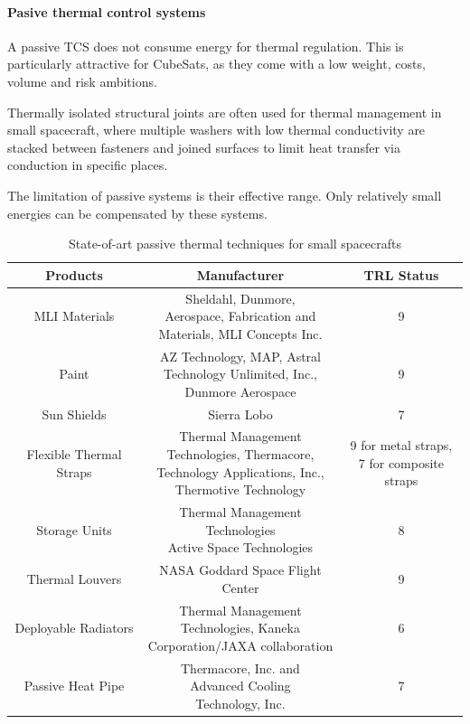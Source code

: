 \paragraph{Pasive thermal control systems}

A passive TCS does not consume energy for thermal regulation. This is particularly
attractive for CubeSats, as they come with a low weight, costs, volume and risk ambitions.

Thermally isolated structural joints are often used for thermal management in small
spacecraft, where multiple washers with low thermal conductivity are stacked
between fasteners and joined surfaces to limit heat transfer via conduction in
specific places.

The limitation of passive systems is their effective range. Only relatively small
energies can be compensated by these systems.

\begin{table}[h!]
	\centering
	\begin{tabular}{c c c}
		\hline
		\textbf{Products} & \textbf{Manufacturer} & \textbf{TRL Status} \\
		\hline
		MLI Materials &
		\pbox{8cm}{Sheldahl, Dunmore,\\Aerospace, Fabrication and\\Materials, MLI Concepts Inc.} &
		9 \\ \hline
		Paint &
		\pbox{8cm}{AZ Technology, MAP, Astral\\Technology Unlimited, Inc.,\\Dunmore Aerospace} &
		9 \\ \hline
		Sun Shields & Sierra Lobo & 7 \\ \hline
		Flexible Thermal Straps &
		\pbox{8cm}{Thermal Management\\Technologies, Thermacore,\\Technology Applications, Inc.,\\Thermotive Technology} &
		\pbox{5cm}{9 for metal straps,\\7 for composite straps} \\ \hline
		Storage Units &
		\pbox{8cm}{Thermal Management Technologies\\Active Space Technologies} &
		8 \\ \hline
		Thermal Louvers & NASA Goddard Space Flight Center & 9 \\ \hline
		Deployable Radiators &
		\pbox{8cm}{Thermal Management\\Technologies, Kaneka\\Corporation/JAXA collaboration} &
		6 \\ \hline
		Passive Heat Pipe &
		\pbox{8cm}{Thermacore, Inc. and\\Advanced Cooling\\Technology, Inc.} &
		7 \\ \hline
	\end{tabular}
	\caption[State-of-art passive thermal techniques]{State-of-art passive thermal techniques for small spacecrafts \cite{NASA_thermal}}
	\label{tab:passive_thermal}
\end{table}

